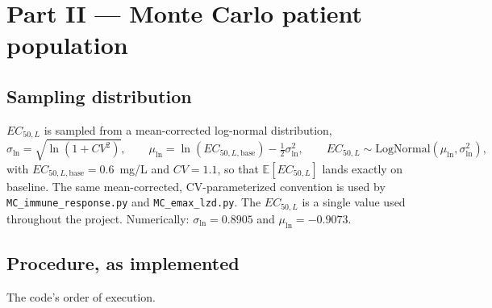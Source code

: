 \documentclass[11pt]{article}
\begin{document}
\section{Part II --- Monte Carlo patient population}
\label{sec:montecarlo}

\subsection{Sampling distribution}

$EC_{50,L}$ is sampled from a mean-corrected log-normal distribution,
\begin{equation}
\sigma_{\ln} = \sqrt{\ln(1+CV^2)}, \qquad
\mu_{\ln} = \ln(EC_{50,L,\mathrm{base}}) - \tfrac{1}{2}\sigma_{\ln}^2, \qquad
EC_{50,L} \sim \mathrm{LogNormal}(\mu_{\ln}, \sigma_{\ln}^2),
\label{eq:lognormal}
\end{equation}
with $EC_{50,L,\mathrm{base}} = 0.6$~mg/L and $CV = 1.1$, so that
$\mathbb{E}[EC_{50,L}]$ lands exactly on baseline.  The same
mean-corrected, CV-parameterized convention is used by
\texttt{MC\_immune\_response.py} and \texttt{MC\_emax\_lzd.py}. The
$EC_{50,L}$ is a single value used throughout the project.  Numerically:
$\sigma_{\ln} = 0.8905$ and $\mu_{\ln} = -0.9073$.

\subsection{Procedure, as implemented}

The code's order of execution.
\end{document}
